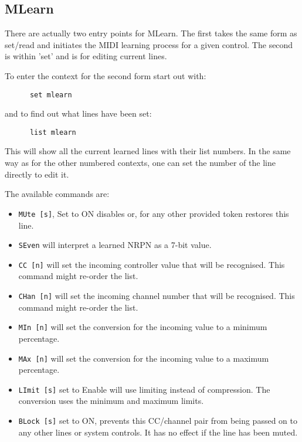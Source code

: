 \subsection{MLearn}
\label{subsec:command_line_mlearn}
   There are actually two entry points for MLearn. The first takes the same form
   as set/read and initiates the MIDI learning process for a given control.
   The second is within 'set' and is for editing current lines.

   To enter the context for the second form start out with:
   \begin{verbatim}
      set mlearn
   \end{verbatim}
   and to find out what lines have been set:
   \begin{verbatim}
      list mlearn
   \end{verbatim}
   This will show all the current learned lines with their list numbers.
   In the same way as for the other numbered contexts, one can set the number
   of the line directly to edit it.

   The available commands are:

   \begin{itemize}
      \item \texttt{MUte [s]}, Set to ON disables or, for any other provided token
         restores this line.
      \item \texttt{SEven} will interpret a learned NRPN as a 7-bit value.
      \item \texttt{CC [n]} will set the incoming controller value that will
         be recognised.  This command might re-order the list.
      \item \texttt{CHan [n]} will set the incoming channel number that will
         be recognised.  This command might re-order the list.
      \item \texttt{MIn [n]} will set the conversion for the incoming
         value to a minimum percentage.
      \item \texttt{MAx [n]} will set the conversion for the incoming
         value to a maximum percentage.
      \item \texttt{LImit [s]} set to Enable will use limiting instead of
         compression.  The conversion uses the minimum and maximum limits.
      \item \texttt{BLock [s]} set to ON, prevents this CC/channel pair from
        being passed on to any other lines or system controls.  It has no effect
        if the line has been muted.
   \end{itemize}

